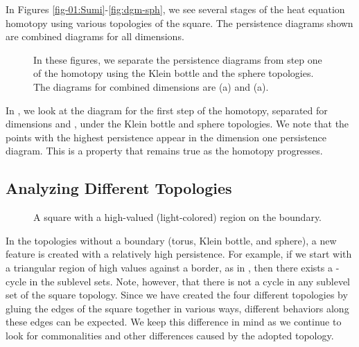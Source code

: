 In Figures \ref{fig-01:Sumi}-\ref{fig:dgm-sph}, we see several stages of the
heat equation homotopy using various topologies of the square.  The persistence 
diagrams shown are combined diagrams for all dimensions. 
\begin{figure}[hbt]
	\centering
 \caption{In these figures, we separate the persistence diagrams from step one of the homotopy
          using the Klein bottle and the sphere topologies.  The diagrams for combined dimensions are
          (a) and (a).}
 \label{fig:splitDimensions}
\end{figure}
In , we look at the diagram for the first step
of the homotopy, separated for dimensions  and 
, under the Klein bottle and sphere topologies.  We note that the points
with the highest persistence appear in the dimension one persistence diagram.
This is a property that remains true as the homotopy progresses.

\subsection{Analyzing Different Topologies}
\begin{figure}[ht]
 \vspace*{0.1in}
 \centering
 \centerline{}
 \caption[Triangle on Boundary]{
                 A square with a high-valued (light-colored)
                 region on the boundary.
                }\label{fig:tri-bdry}
\end{figure}
In the topologies without a boundary (torus, Klein bottle, and sphere), a new
feature is created with a relatively high persistence.  For example, if we 
start with a triangular region of high values against a border, as in 
, then there exists a -cycle in the sublevel sets. 
Note, however, that there is not a cycle in any sublevel set of the square
topology.  Since we have created the four different topologies by gluing the 
edges of the square together in various ways, different behaviors along these
edges can be expected. We keep this difference in mind as we continue to look 
for commonalities and other differences caused by the adopted topology.

